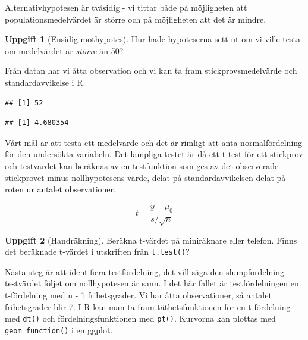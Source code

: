 \documentclass[
]{book}
\newenvironment{Shaded}{\begin{snugshade}}{\end{snugshade}}
\newcommand{\FunctionTok}[1]{\textcolor[rgb]{0.13,0.29,0.53}{\textbf{#1}}}
\newcommand{\NormalTok}[1]{#1}
\newcommand{\SpecialCharTok}[1]{\textcolor[rgb]{0.81,0.36,0.00}{\textbf{#1}}}
\theoremstyle{definition}
\theoremstyle{definition}
\theoremstyle{definition}
\newtheorem{exercise}{Uppgift}[chapter]
\theoremstyle{definition}
\theoremstyle{remark}
\begin{document}
Alternativhypotesen är tvåsidig - vi tittar både på möjligheten att populationsmedelvärdet är större och på möjligheten att det är mindre.

\begin{exercise}[Ensidig mothypotes]
Hur hade hypoteserna sett ut om vi ville testa om medelvärdet är \emph{större} än 50?
\end{exercise}

Från datan har vi åtta observation och vi kan ta fram stickprovsmedelvärde och standardavvikelse i R.

\begin{Shaded}
\end{Shaded}

\begin{verbatim}
## [1] 52
\end{verbatim}

\begin{Shaded}
\end{Shaded}

\begin{verbatim}
## [1] 4.680354
\end{verbatim}

Vårt mål är att testa ett medelvärde och det är rimligt att anta normalfördelning för den undersökta variabeln. Det lämpliga testet är då ett t-test för ett stickprov och testvärdet kan beräknas av en testfunktion som ges av det observerade stickprovet minus nollhypotesens värde, delat på standardavvikelsen delat på roten ur antalet observationer.

\[t = \frac{\bar{y} - \mu_0}{s/\sqrt{n}}\]

\begin{exercise}[Handräkning]
Beräkna t-värdet på miniräknare eller telefon. Finns det beräknade t-värdet i utskriften från \texttt{t.test()}?
\end{exercise}

Nästa steg är att identifiera testfördelning, det vill säga den slumpfördelning testvärdet följet om nollhypotesen är sann. I det här fallet är testfördelningen en t-fördelning med n - 1 frihetsgrader. Vi har åtta observationer, så antalet frihetsgrader blir 7. I R kan man ta fram täthetsfunktionen för en t-fördelning med \texttt{dt()} och fördelningsfunktionen med \texttt{pt()}. Kurvorna kan plottas med \texttt{geom\_function()} i en ggplot.
\end{document}
